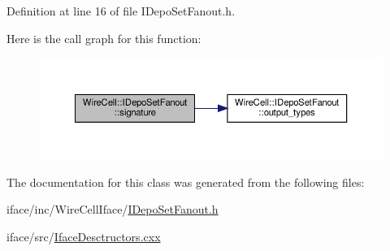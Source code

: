 Definition at line 16 of file I\+Depo\+Set\+Fanout.\+h.

Here is the call graph for this function\+:
\nopagebreak
\begin{figure}[H]
\begin{center}
\leavevmode
\includegraphics[width=350pt]{class_wire_cell_1_1_i_depo_set_fanout_a7cf17fc3925de7224c8c8472e09f689e_cgraph}
\end{center}
\end{figure}


The documentation for this class was generated from the following files\+:\begin{DoxyCompactItemize}
\item 
iface/inc/\+Wire\+Cell\+Iface/\hyperlink{_i_depo_set_fanout_8h}{I\+Depo\+Set\+Fanout.\+h}\item 
iface/src/\hyperlink{_iface_desctructors_8cxx}{Iface\+Desctructors.\+cxx}\end{DoxyCompactItemize}
